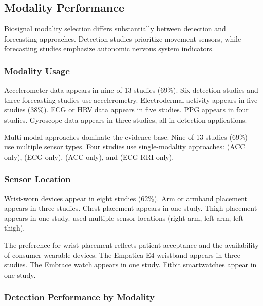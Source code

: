 \subsection{Modality Performance}

Biosignal modality selection differs substantially between detection and forecasting approaches. Detection studies prioritize movement sensors, while forecasting studies emphasize autonomic nervous system indicators.

\subsubsection{Modality Usage}

Accelerometer data appears in nine of 13 studies (69\%). Six detection studies and three forecasting studies use accelerometry. Electrodermal activity appears in five studies (38\%). ECG or HRV data appears in five studies. PPG appears in four studies. Gyroscope data appears in three studies, all in detection applications.

Multi-modal approaches dominate the evidence base. Nine of 13 studies (69\%) use multiple sensor types. Four studies use single-modality approaches: \textcite{spahrDeepLearningbasedDetection2025} (ACC only), \textcite{reintjesECGBasedDetectionEpileptic2025} (ECG only), \textcite{borujenyDetectionEpilepticSeizure2013} (ACC only), and \textcite{odeDevelopmentEpilepticSeizure2023} (ECG RRI only).

\subsubsection{Sensor Location}

Wrist-worn devices appear in eight studies (62\%). Arm or armband placement appears in three studies. Chest placement appears in one study. Thigh placement appears in one study. \textcite{borujenyDetectionEpilepticSeizure2013} used multiple sensor locations (right arm, left arm, left thigh).

The preference for wrist placement reflects patient acceptance and the availability of consumer wearable devices. The Empatica E4 wristband appears in three studies. The Embrace watch appears in one study. Fitbit smartwatches appear in one study.

\subsubsection{Detection Performance by Modality}

